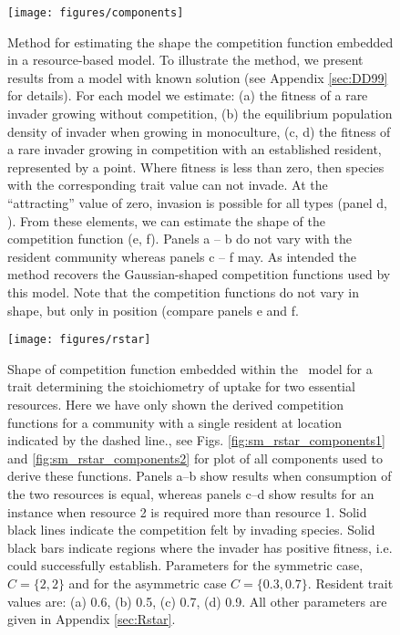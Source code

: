 \documentclass[a4paper,11pt]{article}
\begin{document}
\begin{figure}[h]
 \centering
 \texttt{[image: figures/components]}
 \caption{Method for estimating the shape the competition function
   embedded in a resource-based model. To illustrate the
   method, we present results from a model with known solution
   \citep{Dieckmann-1999} (see Appendix \ref{sec:DD99} for
   details). For each model we estimate: (a) the fitness of a rare
   invader growing without competition, (b) the equilibrium population
   density of invader when growing in monoculture, (c, d) the fitness
   of a rare invader growing in competition with an established
   resident, represented by a point.  Where fitness is less than zero,
   then species with the corresponding trait value can not invade.  At
   the ``attracting'' value of zero, invasion is possible for all
   types (panel d, \citealt{Dieckmann-1999}).  From these elements, we
   can estimate the shape of the competition function (e, f).  Panels
   a -- b do not vary with the resident community whereas panels c --
   f may.
   As intended the method recovers the Gaussian-shaped competition
   functions used by this model.  Note that the competition functions do
   not vary in shape, but only in position (compare panels e and f.}
  \label{fig:components}
\end{figure}

\begin{figure}[h]
  \centering
  \texttt{[image: figures/rstar]}
  \caption{Shape of competition function embedded within the \Rstar\ model
  for a trait determining the stoichiometry of uptake for two essential resources.
  Here we have only shown the derived  competition functions for a
  community with a single resident at location indicated by the dashed line., see Figs.
  \ref{fig:sm_rstar_components1} and \ref{fig:sm_rstar_components2} for plot of all
  components used to derive these functions.
  Panels a--b show results when consumption of the two resources is equal, whereas
  panels c--d show results for an instance when resource 2 is required more than
  resource 1.
  Solid black lines indicate the competition felt by invading species. Solid
  black bars indicate regions where the invader has positive fitness, i.e.
  could successfully establish. Parameters for the symmetric case, $C = \{2, 2\}$ and 
  for the asymmetric case $C = \{0.3, 0.7\}$. Resident
  trait values are: (a) 0.6, (b) 0.5, (c) 0.7, (d) 0.9. All other parameters
  are given in Appendix \ref{sec:Rstar}.}
  \label{fig:Rstar}
\end{figure}
\end{document}
